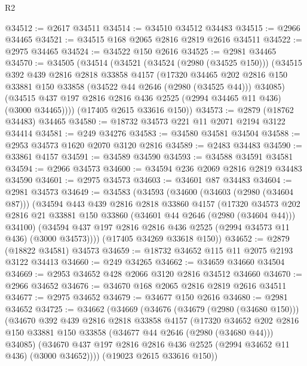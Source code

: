 \begin{lexlean}{R2}
\begin{coremodule}
@34512 := @2617 @34511
@34514 := @34510 @34512 @34483
@34515 := @2966 @34465
@34521 := @34515 @168 @2065 @2816 @2819 @2616 @34511
@34522 := @2975 @34465
@34524 := @34522 @150 @2616
@34525 := @2981 @34465
@34570 := @34505
    (@34514
      (@34521
        (@34524 (@2980 (@34525 @150)))
        (@34515
          @392
          @439
          @2816
          @2818
          @33858
          @4157
          (@17320
            @34465
            @202
            @2816
            @150
            @33881
            @150
            @33858
            (@34522 @44 @2646 (@2980 (@34525 @44)))
            @34085)
          (@34515 @437 @197 @2816 @2816 @436 @2525 (@2994 @34465 @11 @436) (@3000 @34465))))
      (@17405 @2615 @33616 @150))
@34573 := @2879 (@18762 @34483) @34465
@34580 := @18732 @34573 @221 @11 @2071 @2194 @3122 @34414
@34581 := @249 @34276
@34583 := @34580 @34581 @34504
@34588 := @2953 @34573 @1620 @2070 @3120 @2816
@34589 := @2483 @34483
@34590 := @33861 @4157
@34591 := @34589 @34590
@34593 := @34588 @34591 @34581
@34594 := @2966 @34573
@34600 := @34594 @236 @2069 @2816 @2819 @34483 @34590
@34601 := @2975 @34573
@34603 := @34601 @87 @34483
@34604 := @2981 @34573
@34649 := @34583
    (@34593
      (@34600
        (@34603 (@2980 (@34604 @87)))
        (@34594
          @443
          @439
          @2816
          @2818
          @33860
          @4157
          (@17320
            @34573
            @202
            @2816
            @21
            @33881
            @150
            @33860
            (@34601 @44 @2646 (@2980 (@34604 @44)))
            @34100)
          (@34594 @437 @197 @2816 @2816 @436 @2525 (@2994 @34573 @11 @436) (@3000 @34573))))
      (@17405 @34269 @33618 @150))
@34652 := @2879 (@18822 @34581) @34573
@34659 := @18732 @34652 @115 @11 @2075 @2193 @3122 @34413
@34660 := @249 @34265
@34662 := @34659 @34660 @34504
@34669 := @2953 @34652 @428 @2066 @3120 @2816 @34512 @34660
@34670 := @2966 @34652
@34676 := @34670 @168 @2065 @2816 @2819 @2616 @34511
@34677 := @2975 @34652
@34679 := @34677 @150 @2616
@34680 := @2981 @34652
@34725 := @34662
    (@34669
      (@34676
        (@34679 (@2980 (@34680 @150)))
        (@34670
          @392
          @439
          @2816
          @2818
          @33858
          @4157
          (@17320
            @34652
            @202
            @2816
            @150
            @33881
            @150
            @33858
            (@34677 @44 @2646 (@2980 (@34680 @44)))
            @34085)
          (@34670 @437 @197 @2816 @2816 @436 @2525 (@2994 @34652 @11 @436) (@3000 @34652))))
      (@19023 @2615 @33616 @150))

\end{coremodule}
\end{lexlean}

